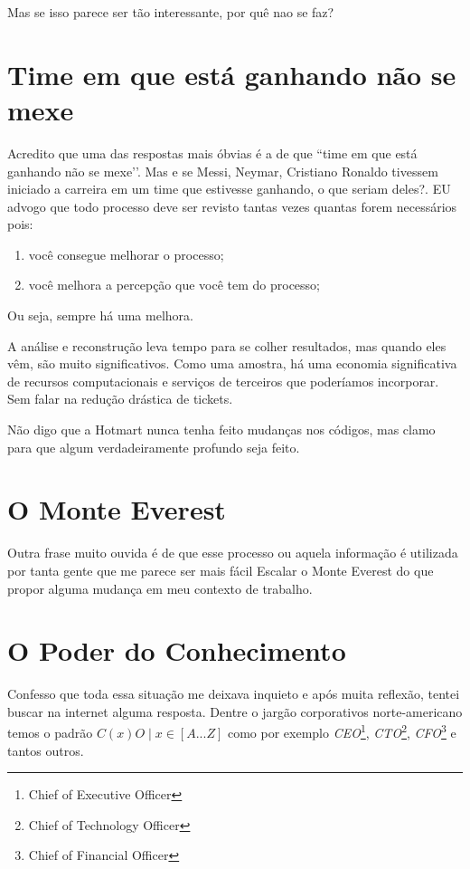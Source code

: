 \documentclass[a4paper]{article}
\begin{document}
Mas se isso parece ser tão interessante, por quê nao se faz?

\section{Time em que está ganhando não se mexe}

Acredito que uma das respostas mais óbvias é a de que ``time em que está ganhando não se mexe’’. Mas e se Messi, Neymar, Cristiano Ronaldo tivessem iniciado a carreira em um time que estivesse ganhando, o que seriam deles?. EU advogo que todo processo deve ser revisto tantas vezes quantas forem necessários pois:
\begin{enumerate}
    \item você consegue melhorar o processo;
    \item você melhora a percepção que você tem do processo;
\end{enumerate}
Ou seja, sempre há uma melhora.

A análise e reconstrução leva tempo para se colher resultados, mas quando eles vêm, são muito significativos. Como uma amostra, há uma economia significativa de recursos computacionais e serviços de terceiros que poderíamos incorporar. Sem falar na redução drástica de tickets.

Não digo que a Hotmart nunca tenha feito mudanças nos códigos, mas clamo para que algum verdadeiramente profundo seja feito.

\section{O Monte Everest}

Outra frase muito ouvida é de que esse processo ou aquela informação é utilizada por tanta gente que me parece ser mais fácil Escalar o Monte Everest do que propor alguma mudança em meu contexto de trabalho.

\section{O Poder do Conhecimento}

Confesso que toda essa situação me deixava inquieto e após muita reflexão, tentei buscar na internet alguma resposta. Dentre o jargão corporativos norte-americano temos o padrão $C(x)O \; | \; x \in [A...Z]$ como por exemplo \emph{CEO}\footnote{Chief of Executive Officer}, \emph{CTO}\footnote{Chief of Technology Officer}, \emph{CFO}\footnote{Chief of Financial Officer} e tantos outros. 
\end{document}
